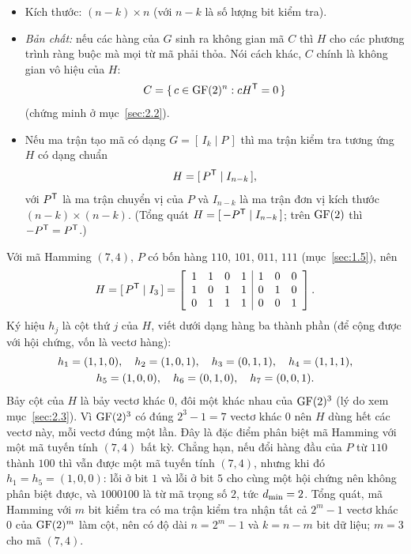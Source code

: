 \begin{itemize}
  \item Kích thước: $(n-k) \times n$ (với $n-k$ là số lượng bit kiểm tra).
  \item \emph{Bản chất:} nếu các hàng của $G$ sinh ra không gian mã $C$ thì
        $H$ cho các phương trình ràng buộc mà mọi từ mã phải thỏa. Nói cách
        khác, $C$ chính là không gian vô hiệu của $H$:
        \begin{equation}\label{eq:C-ker}
          C = \{\, c \in \mathrm{GF}(2)^{n} : cH^{\mathsf{T}} = 0 \,\}
        \end{equation}
        (chứng minh ở mục~\ref{sec:2.2}).
  \item Nếu ma trận tạo mã có dạng $G = [\,I_k \mid P\,]$ thì ma trận kiểm tra
        tương ứng $H$ có dạng chuẩn
        \[
          H = [\,P^{\mathsf{T}} \mid I_{n-k}\,],
        \]
        với $P^{\mathsf{T}}$ là ma trận chuyển vị của $P$ và $I_{n-k}$ là ma trận đơn vị
        kích thước $(n-k) \times (n-k)$. (Tổng quát $H = [\,-P^{\mathsf{T}} \mid I_{n-k}\,]$;
        trên $\mathrm{GF}(2)$ thì $-P^{\mathsf{T}} = P^{\mathsf{T}}$.)
\end{itemize}

Với mã Hamming $(7,4)$, $P$ có bốn hàng $110$, $101$, $011$, $111$
(mục~\ref{sec:1.5}), nên
\begin{equation}\label{eq:H}
  H = [\,P^{\mathsf{T}} \mid I_3\,] = \left[\begin{array}{cccc|ccc} 1 & 1 & 0 & 1 & 1 & 0 & 0\\ 1 & 0 & 1 & 1 & 0 & 1 & 0\\ 0 & 1 & 1 & 1 & 0 & 0 & 1 \end{array}\right] .
\end{equation}
Ký hiệu $h_j$ là cột thứ $j$ của $H$, viết dưới dạng hàng ba thành phần (để cộng
được với hội chứng, vốn là vectơ hàng):
\begin{gather*}
  h_1 = (1,1,0),\quad h_2 = (1,0,1),\quad h_3 = (0,1,1),\quad
  h_4 = (1,1,1),\\
  h_5 = (1,0,0),\quad h_6 = (0,1,0),\quad h_7 = (0,0,1).
\end{gather*}
Bảy cột của $H$ là bảy vectơ khác $0$, đôi một khác nhau của $\mathrm{GF}(2)^{3}$ (lý do
xem mục~\ref{sec:2.3}). Vì $\mathrm{GF}(2)^{3}$ có đúng $2^3 - 1 = 7$ vectơ khác $0$ nên
$H$ dùng hết các vectơ này, mỗi vectơ đúng một lần. Đây là đặc điểm phân biệt
mã Hamming với một mã tuyến tính $(7,4)$ bất kỳ. Chẳng hạn, nếu đổi hàng đầu
của $P$ từ $110$ thành $100$ thì vẫn được một mã tuyến tính $(7,4)$, nhưng khi
đó $h_1 = h_5 = (1,0,0)$: lỗi ở bit $1$ và lỗi ở bit $5$ cho cùng một hội chứng
nên không phân biệt được, và $1000100$ là từ mã trọng số $2$, tức $d_{\min} = 2$.
Tổng quát, mã Hamming với $m$ bit kiểm tra có ma trận kiểm tra nhận tất cả
$2^m - 1$ vectơ khác $0$ của $\mathrm{GF}(2)^{m}$ làm cột, nên có độ dài $n = 2^m - 1$ và
$k = n - m$ bit dữ liệu; $m = 3$ cho mã $(7,4)$.

